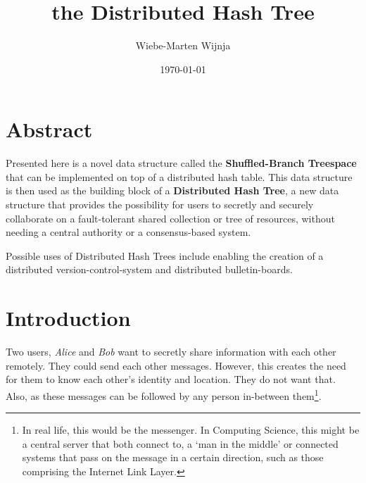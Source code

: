 \documentclass[a4paper]{article}
\begin{document}
\title{the Distributed Hash Tree
}
\date{\today}
\author{Wiebe-Marten Wijnja
}

\maketitle

\section{Abstract}

Presented here is a novel data structure called the \textbf{Shuffled-Branch Treespace} that can be implemented on top of a distributed hash table. This data structure is then used as the building block of a \textbf{Distributed Hash Tree}, a new data structure that provides the possibility for users to secretly and securely collaborate on a fault-tolerant shared collection or tree of resources, without needing a central authority or a consensus-based system.


 Possible uses of Distributed Hash Trees include enabling the creation of a distributed version-control-system and distributed bulletin-boards.


\section{Introduction}

Two users, \textit{Alice} and \textit{Bob} want to secretly share information with each other remotely. They could send each other messages. However, this creates the need for them to know each other's identity and location. They do not want that. Also, as these messages can be followed by any person in-between them\footnote{In real life, this would be the messenger. In Computing Science, this might be a central server that both connect to, a `man in the middle' or  connected systems that pass on the message in a certain direction, such as those comprising the Internet Link Layer.}.\\
\end{document}
